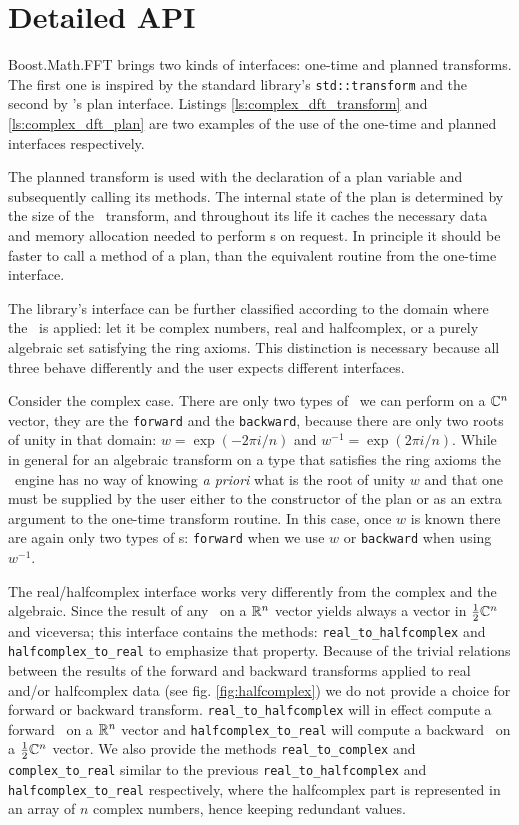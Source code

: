 \section{Detailed API}
Boost.Math.FFT brings two kinds of interfaces: one-time and planned transforms.
The first one is inspired by the standard library's \texttt{std::transform} 
and the second by \fftw's plan interface. Listings
\ref{ls:complex_dft_transform} and \ref{ls:complex_dft_plan} are two examples of
the use of the one-time and planned interfaces respectively.

The planned transform is used with
the declaration of a plan variable and subsequently calling its methods.
The internal state of the plan is determined by the size of the \dft\ transform,
and throughout its life it caches the necessary data and memory allocation
needed to perform \dft s on request. In principle it should be faster to call a
method of a plan, than the equivalent routine from the one-time interface.

The library's interface can be further classified according to the domain where
the \dft\ is applied: let it be complex numbers, real and halfcomplex, or a
purely algebraic set satisfying the ring axioms. This distinction is necessary
because all three behave differently and the user expects different interfaces.

Consider the complex case. There are only two types of \dft\ we can perform on
a $\mathbb{C}^n$ vector, they are the \verb|forward| and the \verb|backward|, 
because there are only two roots of unity in that domain:
$w = \exp( - 2 \pi i/n)$ 
and
$w^{-1} = \exp( 2 \pi i/n)$.
While in general for an algebraic transform on a type that satisfies the ring
axioms the \dft\ engine has no way of knowing \emph{a priori} what is the root
of unity $w$ and that one must be supplied by the user either to the constructor
of the plan or as an extra argument to the one-time transform routine. In this
case, once $w$ is known there are again only two types of \dft s: \verb|forward| 
when we use $w$ or \verb|backward| when using $w^{-1}$.

The real/halfcomplex interface works very differently from the complex and the
algebraic. Since the result of any \dft\ on a $\mathbb{R}^n$ vector yields always a
vector in $\frac{1}{2}\mathbb{C}^n$ and viceversa; this interface contains the methods:
\verb|real_to_halfcomplex| and \verb|halfcomplex_to_real| to emphasize that
property. Because of the trivial relations between the results of the forward
and backward transforms applied to real and/or halfcomplex data (see fig.
\ref{fig:halfcomplex}) we do not provide a choice for forward or backward
transform. \verb|real_to_halfcomplex| will in effect compute a forward \dft\ on
a $\mathbb{R}^n$ vector and \verb|halfcomplex_to_real| will compute a backward \dft\ on a
$\frac{1}{2}\mathbb{C}^n$ vector. We also provide the methods \verb|real_to_complex|
and \verb|complex_to_real| similar to the previous \verb|real_to_halfcomplex|
and \verb|halfcomplex_to_real| respectively, where the halfcomplex part is
represented in an array of $n$ complex numbers, hence keeping redundant values.


